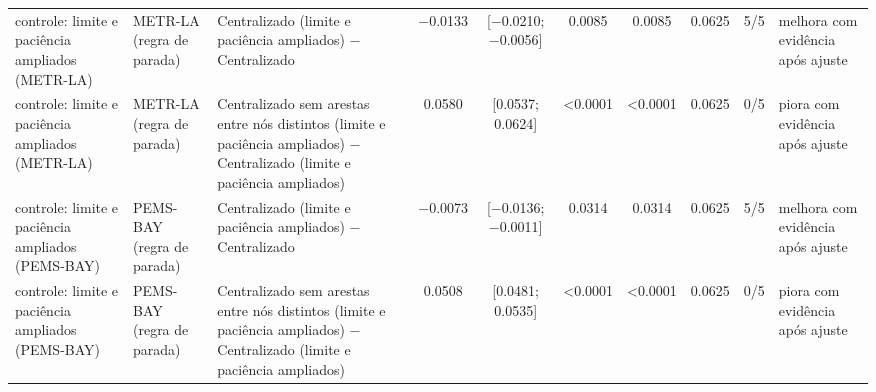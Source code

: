 \begin{tabular}{lllccccccl}
controle: limite e paciência ampliados (METR-LA) & METR-LA (regra de parada) & Centralizado (limite e paciência ampliados) − Centralizado & \num{-0.0133} & [\num{-0.0210}; \num{-0.0056}] & \num{0.0085} & \num{0.0085} & \num{0.0625} & 5/5 & melhora com evidência após ajuste \\
controle: limite e paciência ampliados (METR-LA) & METR-LA (regra de parada) & Centralizado sem arestas entre nós distintos (limite e paciência ampliados) − Centralizado (limite e paciência ampliados) & \num{+0.0580} & [\num{+0.0537}; \num{+0.0624}] & \num{<0.0001} & \num{<0.0001} & \num{0.0625} & 0/5 & piora com evidência após ajuste \\
controle: limite e paciência ampliados (PEMS-BAY) & PEMS-BAY (regra de parada) & Centralizado (limite e paciência ampliados) − Centralizado & \num{-0.0073} & [\num{-0.0136}; \num{-0.0011}] & \num{0.0314} & \num{0.0314} & \num{0.0625} & 5/5 & melhora com evidência após ajuste \\
controle: limite e paciência ampliados (PEMS-BAY) & PEMS-BAY (regra de parada) & Centralizado sem arestas entre nós distintos (limite e paciência ampliados) − Centralizado (limite e paciência ampliados) & \num{+0.0508} & [\num{+0.0481}; \num{+0.0535}] & \num{<0.0001} & \num{<0.0001} & \num{0.0625} & 0/5 & piora com evidência após ajuste \\
\bottomrule
\end{tabular}
